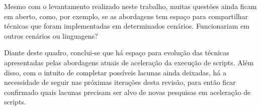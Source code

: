 \documentclass[sigconf]{acmart}
\begin{document}
Mesmo com o levantamento realizado neste trabalho, muitas questões ainda ficam em aberto, como, por exemplo, se as abordagens tem espaço para compartilhar técnicas que foram implementadas em determinados cenários. Funcionariam em outros cenários ou linguagens?

Diante deste quadro, conclui-se que há espaço para evolução das técnicas apresentadas pelas abordagens atuais de aceleração da execução de scripts. Além disso, com o intuito de completar possíveis lacunas ainda deixadas, há a necessidade de seguir nas próximas iterações desta revisão, para então ficar confirmado quais lacunas precisam ser alvo de novas pesquisas em aceleração de scripts.



\end{document}
